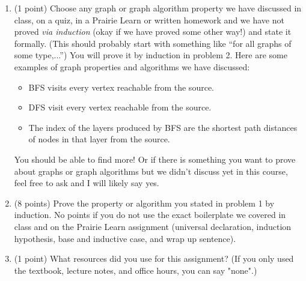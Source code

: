 \documentclass[11pt]{article}
\begin{document}
\newpage


\begin{enumerate}

\item (1 point) Choose any graph or graph algorithm property we have discussed
in class, on a quiz, in a Prairie Learn or written homework and we have not
proved \emph{via induction} (okay if we have proved some other way!) and state
it formally. (This should probably start with something like ``for all graphs of some type,...'') You will
prove it by induction in problem 2. Here are some examples of graph properties
and algorithms we have discussed:
 \begin{itemize}
    \item BFS visits every vertex reachable from the source.
    \item DFS visit every vertex reachable from the source.
    \item The index of the layers produced by BFS are the shortest path
    distances of nodes in that layer from the source.
\end{itemize}

You should be able to find more! Or if there is something you want to prove
about graphs or graph algorithms but we didn't discuss yet in this course, feel
free to ask and I will likely say yes.


\item (8 points) Prove the property or algorithm you stated in problem 1 by induction. No points if you do not use the
exact boilerplate we covered in class and on the Prairie Learn assignment (universal declaration, induction hypothesis, base and inductive case, and wrap up sentence).
\item (1 point) What resources did you use for this assignment? (If you only used the textbook, lecture notes, and office hours, you can say "none".)
    \end{enumerate}
    
\end{document}
